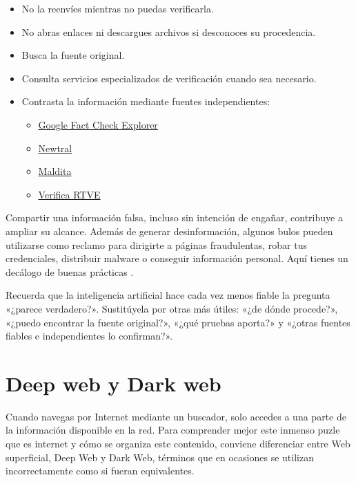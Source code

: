 \documentclass[
  spanish,
  a4paper,
  openany]{book}
\begin{document}
\begin{itemize}
\item
  No la reenvíes mientras no puedas verificarla.
\item
  No abras enlaces ni descargues archivos si desconoces su procedencia.
\item
  Busca la fuente original.
\item
  Consulta servicios especializados de verificación cuando sea necesario.
\item
  Contrasta la información mediante fuentes independientes:

  \begin{itemize}
  \item
    \href{https://toolbox.google.com/factcheck/explorer}{Google Fact Check Explorer}
  \item
    \href{https://www.newtral.es/zona-verificacion/fact-check/}{Newtral}
  \item
    \href{https://maldita.es/malditobulo/1}{Maldita}
  \item
    \href{https://www.rtve.es/noticias/verificartve/}{Verifica RTVE}
  \end{itemize}
\end{itemize}

Compartir una información falsa, incluso sin intención de engañar, contribuye a ampliar su alcance. Además de generar desinformación, algunos bulos pueden utilizarse como reclamo para dirigirte a páginas fraudulentas, robar tus credenciales, distribuir malware o conseguir información personal. Aquí tienes un decálogo de buenas prácticas \citep{OSI-bulos-buenas-practicas}.

Recuerda que la inteligencia artificial hace cada vez menos fiable la pregunta «¿parece verdadero?». Sustitúyela por otras más útiles: «¿de dónde procede?», «¿puedo encontrar la fuente original?», «¿qué pruebas aporta?» y «¿otras fuentes fiables e independientes lo confirman?».

\section{Deep web y Dark web}\label{deep-web-y-dark-web}

Cuando navegas por Internet mediante un buscador, solo accedes a una parte de la información disponible en la red. Para comprender mejor este inmenso puzle que es internet y cómo se organiza este contenido, conviene diferenciar entre Web superficial, Deep Web y Dark Web, términos que en ocasiones se utilizan incorrectamente como si fueran equivalentes.
\end{document}
